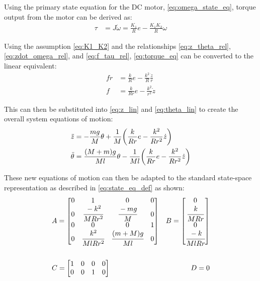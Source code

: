 \documentclass[]{article}
\begin{document}
		Using the primary state equation for the DC motor, \eqref{eq:omega_state_eq}, torque output from the motor can be derived as:
		\begin{align}
			\tau &= J \dot{\omega} = \frac{K_1}{R} e - \frac{K_1 K_2}{R} \omega \label{eq:torque_eq}
		\end{align}
		
		Using the assumption \eqref{eq:K1_K2} and the relationships \eqref{eq:z_theta_rel}, \eqref{eq:zdot_omega_rel}, and \eqref{eq:f_tau_rel}, \eqref{eq:torque_eq} can be converted to the linear equivalent:
		\begin{align}
			f r &= \frac{k}{R} e - \frac{k^2}{R} \frac{\dot{z}}{r} \nonumber\\
			f &= \frac{k}{R r} e - \frac{k^2}{r^2} \dot{z} \label{eq:f_def}
		\end{align}
		
		This can then be substituted into \eqref{eq:z_lin} and \eqref{eq:theta_lin} to create the overall system equations of motion:
		\begin{align}
			\ddot{z} &= - \frac{mg}{M} \theta + \frac{1}{M} \qty(\frac{k}{Rr}e - \frac{k^2}{R r^2} \dot{z}) \label{eq:z_pend_eq}\\
			\ddot{\theta} &= \frac{(M+m)g}{M l} \theta - \frac{1}{M l} \qty(\frac{k}{R r} e - \frac{k^2}{R r^2}\dot{z}) \label{eq:theta_pend_eq}
		\end{align}
	
		These new equations of motion can then be adapted to the standard state-space representation as described in \eqref{eq:state_eq_def} as shown:
		\begin{equation}
			\begin{aligned}
				&A = \mqty[	0 & 1 					& 0 					& 0\\
							0 & \cfrac{-k^2}{MRr^2}	& \cfrac{-mg}{M} 		& 0 \\
							0 & 0 					& 0 					& 1\\
							0 & \cfrac{k^2}{MlRr^2}	& \cfrac{(m+M)g}{Ml}	& 0	]
				&B = \mqty[	0\\
							\cfrac{k}{MRr}\\
							0\\
							\cfrac{-k}{MlRr}] \\ &&\\
				&C = \mqty[	1 & 0 & 0 & 0\\
							0 & 0 & 1 & 0]
				&D = 0
			\end{aligned}
			\label{eq:pendulum_state_matrices}
		\end{equation}
\end{document}
